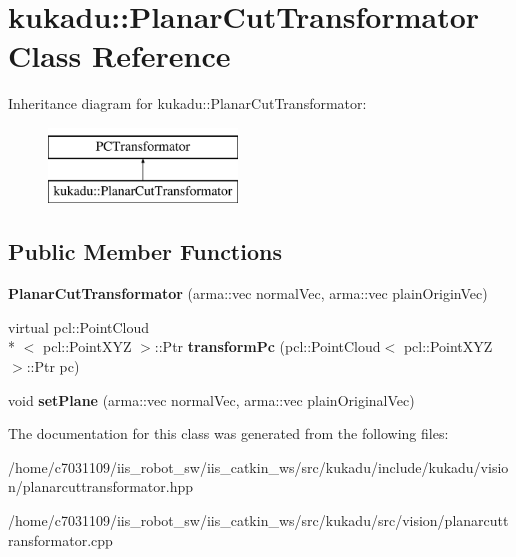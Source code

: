 \hypertarget{classkukadu_1_1PlanarCutTransformator}{\section{kukadu\-:\-:Planar\-Cut\-Transformator Class Reference}
\label{classkukadu_1_1PlanarCutTransformator}
}
Inheritance diagram for kukadu\-:\-:Planar\-Cut\-Transformator\-:\begin{figure}[H]
\begin{center}
\leavevmode
\includegraphics[height=2.000000cm]{classkukadu_1_1PlanarCutTransformator}
\end{center}
\end{figure}
\subsection*{Public Member Functions}
\begin{DoxyCompactItemize}
\item 
\hypertarget{classkukadu_1_1PlanarCutTransformator_a824a1480b44ba0cb1c547605a9f68913}{{\bfseries Planar\-Cut\-Transformator} (arma\-::vec normal\-Vec, arma\-::vec plain\-Origin\-Vec)}\label{classkukadu_1_1PlanarCutTransformator_a824a1480b44ba0cb1c547605a9f68913}

\item 
\hypertarget{classkukadu_1_1PlanarCutTransformator_aa1b53c6e79e383ca2c53c0b0071a4dbc}{virtual pcl\-::\-Point\-Cloud\\*
$<$ pcl\-::\-Point\-X\-Y\-Z $>$\-::Ptr {\bfseries transform\-Pc} (pcl\-::\-Point\-Cloud$<$ pcl\-::\-Point\-X\-Y\-Z $>$\-::Ptr pc)}\label{classkukadu_1_1PlanarCutTransformator_aa1b53c6e79e383ca2c53c0b0071a4dbc}

\item 
\hypertarget{classkukadu_1_1PlanarCutTransformator_a829ea89c08c9f3ad75cdcfdc10aa3c3e}{void {\bfseries set\-Plane} (arma\-::vec normal\-Vec, arma\-::vec plain\-Original\-Vec)}\label{classkukadu_1_1PlanarCutTransformator_a829ea89c08c9f3ad75cdcfdc10aa3c3e}

\end{DoxyCompactItemize}


The documentation for this class was generated from the following files\-:\begin{DoxyCompactItemize}
\item 
/home/c7031109/iis\-\_\-robot\-\_\-sw/iis\-\_\-catkin\-\_\-ws/src/kukadu/include/kukadu/vision/planarcuttransformator.\-hpp\item 
/home/c7031109/iis\-\_\-robot\-\_\-sw/iis\-\_\-catkin\-\_\-ws/src/kukadu/src/vision/planarcuttransformator.\-cpp\end{DoxyCompactItemize}
